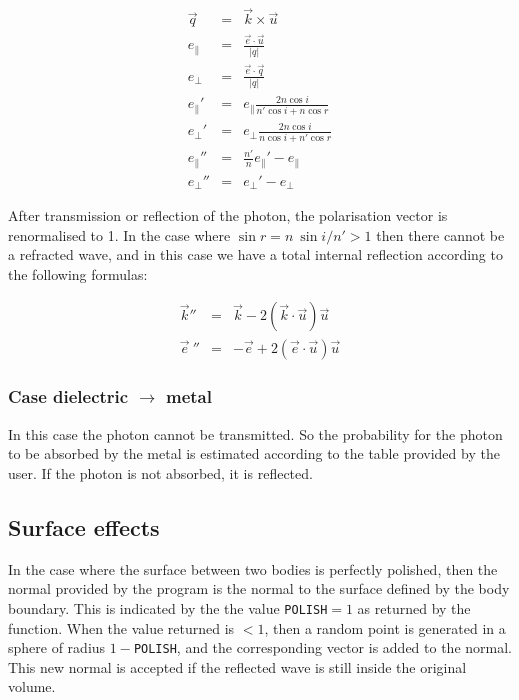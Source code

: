 \begin{eqnarray*}
\vec{q} & = & \vec{k} \times \vec{u} \\
e_{\parallel} & = & \frac{\vec{e} \cdot \vec{u}}{|q|} \\
e_{\perp} & = & \frac{\vec{e} \cdot \vec{q}}{|q|} \\
e_{\parallel}' & = & e_{\parallel} \frac{2 n \cos{i}} {n' \cos{i} + n \cos{r}}\\
e_{\perp}' & = & e_{\perp} \frac{2 n \cos{i}} {n \cos{i} + n' \cos{r}} \\
e_{\parallel}'' & = & \frac{n'}{n} e_{\parallel}'  - e_{\parallel} \\
e_{\perp}'' & = & e_{\perp}' - e_{\perp}
\end{eqnarray*}

After transmission or reflection of the photon, the polarisation vector
is renormalised to 1.
In the case where $\sin{r} = n \: \sin i  /n' > 1$ then there cannot
be a refracted wave, and in this case we have a total internal reflection 
according to the following formulas:

\begin{eqnarray*}
\vec{k}'' & = & \vec{k} - 2 (\vec{k} \cdot \vec{u}) \vec{u} \\
\vec{e}\:'' & = & -\vec{e} + 2 (\vec{e} \cdot \vec{u}) \vec{u}
\end{eqnarray*}

\subsubsection{Case dielectric $\rightarrow$ metal}

In this case the photon cannot be transmitted. So the probability for the
photon to be absorbed by the metal is estimated according to the table
provided by the user. If the photon is not absorbed, it is reflected.

\subsection{Surface effects}

In the case where
the surface between two bodies is perfectly polished, then the
normal provided by the program is the normal to the surface defined by
the body boundary. This is indicated by the the value {\tt POLISH}$=1$
as returned by the  function. When the value returned is 
$< 1$, then a random point is generated in a sphere of radius 
$1-${\tt POLISH}, and the corresponding vector is added to the normal.
This new normal is accepted if the reflected wave is still inside the
original volume.

